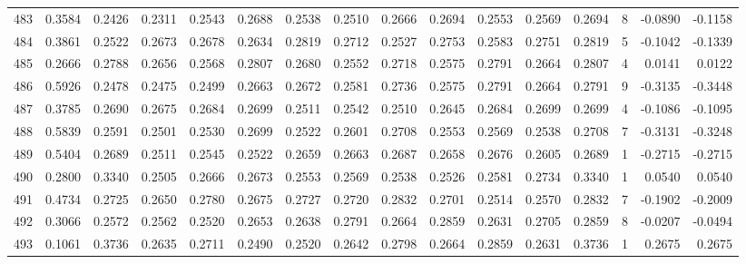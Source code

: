 \begin{tabular}{lrrrrrrrrrrrrrrr}
483 &      0.3584 &  0.2426 &  0.2311 &  0.2543 &  0.2688 &  0.2538 &  0.2510 &  0.2666 &  0.2694 &  0.2553 &   0.2569 &     0.2694 &      8 &                   -0.0890 &                    -0.1158 \\
484 &      0.3861 &  0.2522 &  0.2673 &  0.2678 &  0.2634 &  0.2819 &  0.2712 &  0.2527 &  0.2753 &  0.2583 &   0.2751 &     0.2819 &      5 &                   -0.1042 &                    -0.1339 \\
485 &      0.2666 &  0.2788 &  0.2656 &  0.2568 &  0.2807 &  0.2680 &  0.2552 &  0.2718 &  0.2575 &  0.2791 &   0.2664 &     0.2807 &      4 &                    0.0141 &                     0.0122 \\
486 &      0.5926 &  0.2478 &  0.2475 &  0.2499 &  0.2663 &  0.2672 &  0.2581 &  0.2736 &  0.2575 &  0.2791 &   0.2664 &     0.2791 &      9 &                   -0.3135 &                    -0.3448 \\
487 &      0.3785 &  0.2690 &  0.2675 &  0.2684 &  0.2699 &  0.2511 &  0.2542 &  0.2510 &  0.2645 &  0.2684 &   0.2699 &     0.2699 &      4 &                   -0.1086 &                    -0.1095 \\
488 &      0.5839 &  0.2591 &  0.2501 &  0.2530 &  0.2699 &  0.2522 &  0.2601 &  0.2708 &  0.2553 &  0.2569 &   0.2538 &     0.2708 &      7 &                   -0.3131 &                    -0.3248 \\
489 &      0.5404 &  0.2689 &  0.2511 &  0.2545 &  0.2522 &  0.2659 &  0.2663 &  0.2687 &  0.2658 &  0.2676 &   0.2605 &     0.2689 &      1 &                   -0.2715 &                    -0.2715 \\
490 &      0.2800 &  0.3340 &  0.2505 &  0.2666 &  0.2673 &  0.2553 &  0.2569 &  0.2538 &  0.2526 &  0.2581 &   0.2734 &     0.3340 &      1 &                    0.0540 &                     0.0540 \\
491 &      0.4734 &  0.2725 &  0.2650 &  0.2780 &  0.2675 &  0.2727 &  0.2720 &  0.2832 &  0.2701 &  0.2514 &   0.2570 &     0.2832 &      7 &                   -0.1902 &                    -0.2009 \\
492 &      0.3066 &  0.2572 &  0.2562 &  0.2520 &  0.2653 &  0.2638 &  0.2791 &  0.2664 &  0.2859 &  0.2631 &   0.2705 &     0.2859 &      8 &                   -0.0207 &                    -0.0494 \\
493 &      0.1061 &  0.3736 &  0.2635 &  0.2711 &  0.2490 &  0.2520 &  0.2642 &  0.2798 &  0.2664 &  0.2859 &   0.2631 &     0.3736 &      1 &                    0.2675 &                     0.2675 \\

\end{tabular}
